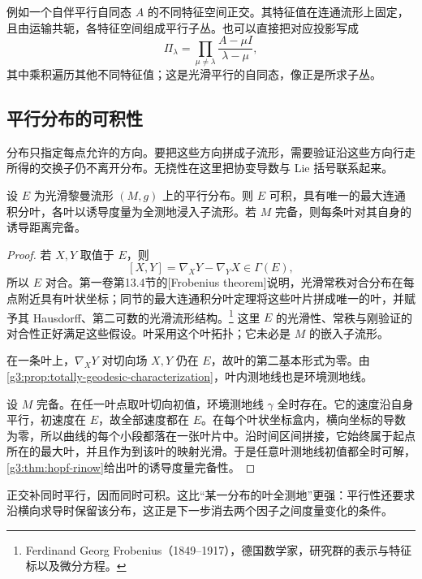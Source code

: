 例如一个自伴平行自同态 \(A\) 的不同特征空间正交。其特征值在连通流形上固定，且由运输共轭，各特征空间组成平行子丛。也可以直接把对应投影写成
\[
	\Pi_\lambda
	=\prod_{\mu\ne\lambda}\frac{A-\mu I}{\lambda-\mu},
\]
其中乘积遍历其他不同特征值；这是光滑平行的自同态，像正是所求子丛。

\subsection{平行分布的可积性}
\label{g3:subsec:0502:03}

分布只指定每点允许的方向。要把这些方向拼成子流形，需要验证沿这些方向行走所得的交换子仍不离开分布。无挠性在这里把协变导数与 Lie 括号联系起来。

\begin{proposition}\label{g3:prop:parallel-distribution-leaves}
	设 \(E\) 为光滑黎曼流形 \((M,g)\) 上的平行分布。则 \(E\) 可积，具有唯一的最大连通积分叶，各叶以诱导度量为全测地浸入子流形。若 \(M\) 完备，则每条叶对其自身的诱导距离完备。
\end{proposition}
\begin{proof}
	若 \(X,Y\) 取值于 \(E\)，则
	\[
		[X,Y]=\nabla_XY-\nabla_YX\in\Gamma(E),
	\]
	所以 \(E\) 对合。第一卷第13.4节的[Frobenius theorem]说明，光滑常秩对合分布在每点附近具有叶状坐标；同节的最大连通积分叶定理将这些叶片拼成唯一的叶，并赋予其 Hausdorff、第二可数的光滑流形结构。\footnote{Ferdinand Georg Frobenius（1849--1917），德国数学家，研究群的表示与特征标以及微分方程。}
	这里 \(E\) 的光滑性、常秩与刚验证的对合性正好满足这些假设。叶采用这个叶拓扑；它未必是 \(M\) 的嵌入子流形。

	在一条叶上，\(\nabla_XY\) 对切向场 \(X,Y\) 仍在 \(E\)，故叶的第二基本形式为零。由\cref{g3:prop:totally-geodesic-characterization}，叶内测地线也是环境测地线。

	设 \(M\) 完备。在任一叶点取叶切向初值，环境测地线 \(\gamma\) 全时存在。它的速度沿自身平行，初速度在 \(E\)，故全部速度都在 \(E\)。在每个叶状坐标盒内，横向坐标的导数为零，所以曲线的每个小段都落在一张叶片中。沿时间区间拼接，它始终属于起点所在的最大叶，并且作为到该叶的映射光滑。于是任意叶测地线初值都全时可解，\cref{g3:thm:hopf-rinow}给出叶的诱导度量完备性。
\end{proof}

正交补同时平行，因而同时可积。这比“某一分布的叶全测地”更强：平行性还要求沿横向求导时保留该分布，这正是下一步消去两个因子之间度量变化的条件。

